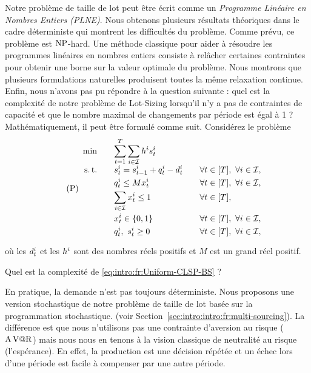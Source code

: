 Notre problème de taille de lot peut être écrit comme un \emph{Programme Linéaire en Nombres Entiers (PLNE)}.
Nous obtenons plusieurs résultats théoriques dans le cadre déterministe qui montrent les difficultés du problème.
Comme prévu, ce problème est $\operatorname{NP}$-hard.
Une méthode classique pour aider à résoudre les programmes linéaires en nombres entiers consiste à relâcher certaines contraintes pour obtenir une borne sur la valeur optimale du problème.
Nous montrons que plusieurs formulations naturelles produisent toutes la même relaxation continue.
Enfin, nous n'avons pas pu répondre à la question suivante : quel est la complexité de notre problème de Lot-Sizing lorsqu'il n'y a pas de contraintes de capacité et que le nombre maximal de changements par période est égal à 1 ?
Mathématiquement, il peut être formulé comme suit.
Considérez le problème
\begin{equation}\tag{P}\label{eq:intro:fr:Uniform-CLSP-BS}
  \begin{array}{rlll}
    \min\quad & \ds \sum_{t=1}^{\horizon} \sum_{i\in\REF} \holding^i \inventory_t^i
    \\ \smallskip
    \st\quad & \ds \inventory_t^i = \inventory_{t-1}^i + \quantity_t^i - \demand_t^i && \forall t\in\range{\horizon},\ \forall i\in\REF,
    \\ \smallskip
    & \ds \quantity_t^i \le M\setup_t^i && \forall t\in\range{\horizon},\ \forall i\in\REF,
    \\ \smallskip
    & \ds \sum_{i\in\REF} \setup_t^i \le 1 && \forall t\in\range{\horizon},
    \\ \smallskip
    & \ds \setup_t^i \in \crbracket{0,1} && \forall t\in\range{\horizon},\ \forall i\in\REF,
    \\ \smallskip
    & \ds \quantity_t^i,\ \inventory_t^i \ge 0 && \forall t\in\range{\horizon},\ \forall i\in\REF,
  \end{array}
\end{equation}
où les $d_t^i$ et les $h^i$ sont des nombres réels positifs et $M$ est un grand réel positif.
\begin{question}
Quel est la complexité de \eqref{eq:intro:fr:Uniform-CLSP-BS} ?
\end{question}


\medskip


En pratique, la demande n'est pas toujours déterministe.
Nous proposons une version stochastique de notre problème de taille de lot basée sur la programmation stochastique. (voir Section~\ref{sec:intro:intro:fr:multi-sourcing}).
La différence est que nous n'utilisons pas une contrainte d'aversion au risque ($\operatorname{A\operatorname{V@R}}$) mais nous nous en tenons à la vision classique de neutralité au risque (l'espérance).
En effet, la production est une décision répétée et un échec lors d'une période est facile à compenser par une autre période.


